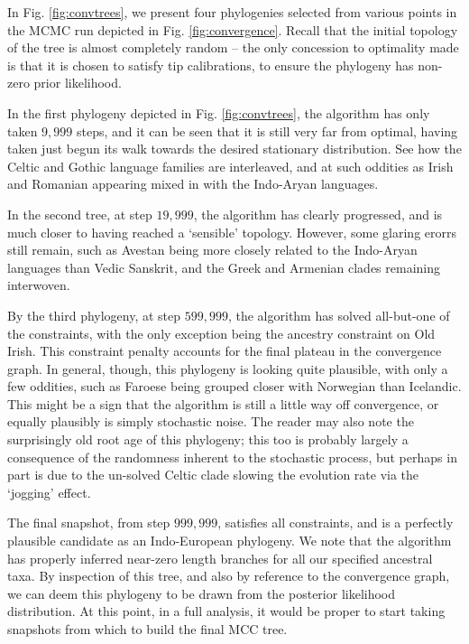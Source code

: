 \documentclass[10pt,journal,compsoc]{IEEEtran}
\begin{document}
In Fig. \ref{fig:convtrees}, we present four phylogenies selected from various points in the MCMC run depicted in Fig. \ref{fig:convergence}. Recall that the initial topology of the tree is almost completely random -- the only concession to optimality made is that it is chosen to satisfy tip calibrations, to ensure the phylogeny has non-zero prior likelihood.

In the first phylogeny depicted in Fig. \ref{fig:convtrees}, the algorithm has only taken $9,999$ steps, and it can be seen that it is still very far from optimal, having taken just begun its walk towards the desired stationary distribution. See how the Celtic and Gothic language families are interleaved, and at such oddities as Irish and Romanian appearing mixed in with the Indo-Aryan languages.

In the second tree, at step $19,999$, the algorithm has clearly progressed, and is much closer to having reached a `sensible' topology. However, some glaring erorrs still remain, such as Avestan being more closely related to the Indo-Aryan languages than Vedic Sanskrit, and the Greek and Armenian clades remaining interwoven.

By the third phylogeny, at step $599,999$, the algorithm has solved all-but-one of the constraints, with the only exception being the ancestry constraint on Old Irish. This constraint penalty accounts for the final plateau in the convergence graph. In general, though, this phylogeny is looking quite plausible, with only a few oddities, such as Faroese being grouped closer with Norwegian than Icelandic. This might be a sign that the algorithm is still a little way off convergence, or equally plausibly is simply stochastic noise. The reader may also note the surprisingly old root age of this phylogeny; this too is probably largely a consequence of the randomness inherent to the stochastic process, but perhaps in part is due to the un-solved Celtic clade slowing the evolution rate via the `jogging' effect.

The final snapshot, from step $999,999$, satisfies all constraints, and is a perfectly plausible candidate as an Indo-European phylogeny. We note that the algorithm has properly inferred near-zero length branches for all our specified ancestral taxa. By inspection of this tree, and also by reference to the convergence graph, we can deem this phylogeny to be drawn from the posterior likelihood distribution. At this point, in a full analysis, it would be proper to start taking snapshots from which to build the final MCC tree.
\end{document}
